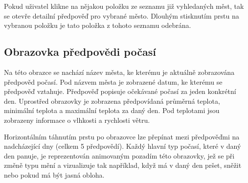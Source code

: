 \documentclass[12pt, a4paper]{article}
\begin{document}
Pokud uživatel klikne na nějakou položku ze seznamu již vyhledaných měst, tak se otevře detailní předpověď pro vybrané město. Dlouhým stisknutím prstu na vybranou položku je tato položka z tohoto seznamu odebrána.

\subsection{Obrazovka předpovědi počasí}

Na této obrazce se nachází název města, ke kterému je aktuálně zobrazována předpověd počasí. Pod názvem města je zobrazené datum, ke kterému se předpověď vztahuje. Předpověď popisuje očekávané počasí za jeden konkrétní den. Uprostřed obrazovky je zobrazena předpovídaná průměrná teplota, minimální teplota a maximální teplota za daný den. Pod teplotami jsou zobrazeny informace o vlhkosti a rychlosti větru.

Horizontálním táhnutím prstu po obrazovce lze přepínat mezi předpověďmi na nadcházející dny (celkem 5 předpovědí). Každý hlavní typ počasí, které v daný den panuje, je reprezentován animovaným pozadím této obrazovky, jež se při změně typu mění a vizualizuje tak například, když má v daný den pršet, sněžit nebo pokud má být jasná obloha.
\end{document}
